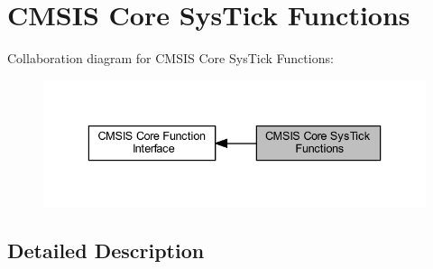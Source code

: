 \hypertarget{group___c_m_s_i_s___core___sys_tick_functions}{}\section{C\+M\+S\+IS Core Sys\+Tick Functions}
\label{group___c_m_s_i_s___core___sys_tick_functions}
Collaboration diagram for C\+M\+S\+IS Core Sys\+Tick Functions\+:
\nopagebreak
\begin{figure}[H]
\begin{center}
\leavevmode
\includegraphics[width=336pt]{group___c_m_s_i_s___core___sys_tick_functions}
\end{center}
\end{figure}


\subsection{Detailed Description}
